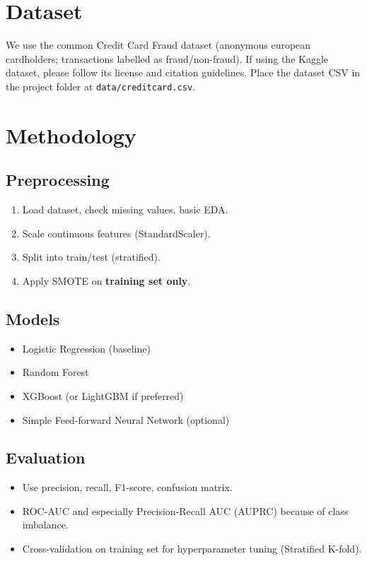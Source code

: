 \documentclass[12pt,a4paper]{article}
\begin{document}
\section{Dataset}
We use the common Credit Card Fraud dataset (anonymous european cardholders; transactions labelled as fraud/non-fraud). If using the Kaggle dataset, please follow its license and citation guidelines. Place the dataset CSV in the project folder at \texttt{data/creditcard.csv}.

\section{Methodology}
\subsection{Preprocessing}
\begin{enumerate}
  \item Load dataset, check missing values, basic EDA.
  \item Scale continuous features (StandardScaler).
  \item Split into train/test (stratified).
  \item Apply SMOTE on \textbf{training set only}.
\end{enumerate}

\subsection{Models}
\begin{itemize}
  \item Logistic Regression (baseline)
  \item Random Forest
  \item XGBoost (or LightGBM if preferred)
  \item Simple Feed-forward Neural Network (optional)
\end{itemize}

\subsection{Evaluation}
\begin{itemize}
  \item Use precision, recall, F1-score, confusion matrix.
  \item ROC-AUC and especially Precision-Recall AUC (AUPRC) because of class imbalance.
  \item Cross-validation on training set for hyperparameter tuning (Stratified K-fold).
\end{itemize}
\end{document}
